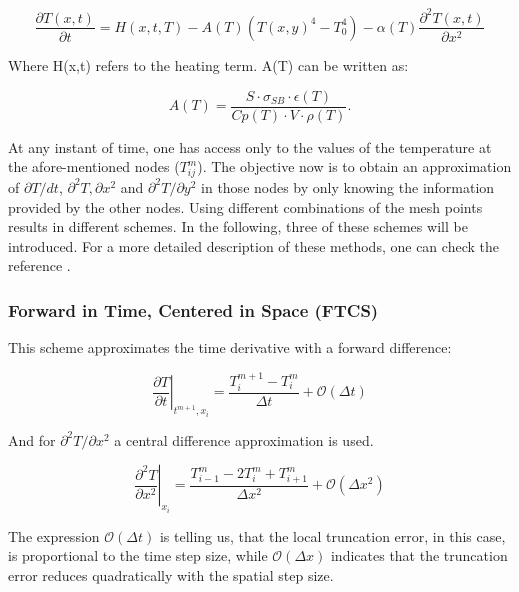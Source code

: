 \begin{equation}
    \frac{\partial T(x,t)}{\partial t} = 
        H(x,t,T)
        - A(T) \left(T(x,y)^4 - T_0^4\right)
            -\alpha (T)  \frac{\partial^2 T(x,t)}{\partial x^2}   
            \label{eq:SimpleHeating}
    \end{equation}

Where H(x,t) refers to the heating term. A(T) can be written as: 

\begin{equation}
    A(T) = \frac{S\cdot \sigma_{SB}\cdot \epsilon(T)}{Cp(T)\cdot V \cdot \rho(T)}. 
\end{equation}

At any instant of time, one has access only to the values of the temperature at the afore-mentioned nodes ($T^{m}_{ij}$). The objective now is to obtain an approximation of $\partial T/dt$, $\partial^2 T,\partial x^2$ and $\partial^2 T/\partial y^2$ in those nodes by only knowing the information provided by the other nodes. Using different combinations of the mesh points results in different schemes. In the following, three of these schemes will be introduced. For a more detailed description of these methods, one can check the reference \parencite[][]{ref:FiniteDifference}.

\subsubsection{Forward in Time, Centered in Space (FTCS)}

This scheme approximates the time derivative with a forward difference: 

\begin{equation}
    \left. \frac{\partial T}{\partial t}\right|_{t^{m+1},x_i}  = \frac{T^{m+1}_i - T^m_i}{\Delta t} +  \mathcal{O} \left( \Delta t \right)
 \end{equation}

And for $\partial^2 T/ \partial x^2$ a central difference approximation is used. 

\begin{equation}
    \left. \frac{\partial^2 T}{\partial x^2}\right|_{x_i} = \frac{T^{m}_{i-1}-2T^m_{i}+T^m_{i+1}}{\Delta x^2}+\mathcal{O}\left(\Delta x^2 \right)
    \label{eq:CD}
\end{equation}

The expression $\mathcal{O}(\Delta t)$ is telling us, that the local truncation error, in this case, is proportional to the time step size, while $\mathcal{O}(\Delta x)$ indicates that the truncation error reduces quadratically with the spatial step size. 

